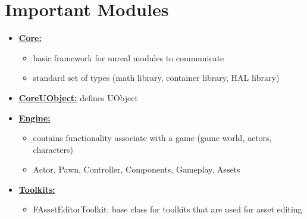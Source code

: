     \section{Important Modules}
        \begin{itemize}
            \item \uline{\textbf{Core:}}
            \begin{itemize}
                \item basic framework for unreal modules to communicate
                \item standard set of types (math library, container library, HAL library)
            \end{itemize}
            \item \uline{\textbf{CoreUObject:}} defines UObject
            \item \uline{\textbf{Engine:}}
            \begin{itemize}
                \item contains functionality associate with a game (game world, actors, characters)
                \item Actor, Pawn, Controller, Components, Gameplay, Assets
            \end{itemize}
            \item \uline{\textbf{Toolkits:}}
            \begin{itemize}
                \item FAssetEditorToolkit: base class for toolkits that are used for asset editing
            \end{itemize}
        \end{itemize}

